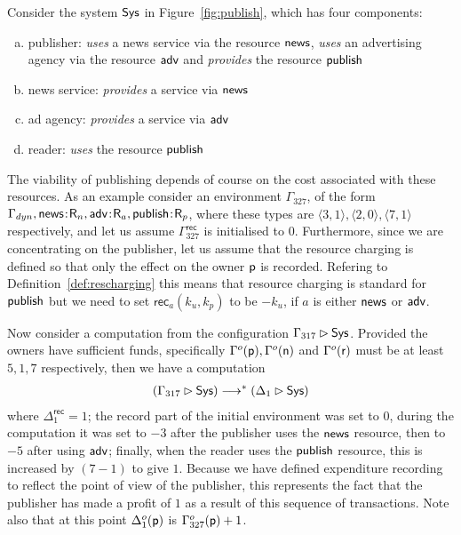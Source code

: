 \documentclass{LMCS}
\newcommand{\with}{\mathbin \rhd}
\newcommand{\record}{{\scriptstyle \mathsf{rec}}}
\newcommand{\Gammadyn}{\Gamma_{\scriptstyle dyn}}
\def\pair(#1,#2){\langle #1 , #2 \rangle}\newcommand{\parrow}{ \mathbin{\rightharpoonup}}
\newcommand{\typeletter}[1]{{\mathsf{#1}}}
\newcommand{\tR}{\typeletter{R}}
\newcommand{\Cassoc}[2]{ {{#1}\kern -0.2em : \kern -0.2em {#2}}}
\newcommand{\smalleval}{\longrightarrow}  \newcommand{\csmalleval}[1]{\longrightarrow^{#1}}
\begin{document}
\begin{exa}[Publishing]\label{ex:publishing}

  Consider the system $\mathsf{Sys}$ in Figure~\ref{fig:publish}, which has four components:
  \begin{enumerate}[(a)]
  \item publisher:  \emph{uses} a news service via the resource $\mathsf{news}$,
        \emph{uses} an advertising agency via the resource $\mathsf{adv}$ and \emph{provides} 
         the resource  $\mathsf{publish}$ 

 \item news service: \emph{provides} a service via $\mathsf{news}$

 \item ad agency: \emph{provides} a service via $\mathsf{adv}$

 \item reader: \emph{uses} the resource $\mathsf{publish}$
  \end{enumerate}
The viability of publishing depends of course on the cost associated with these resources.
As an example consider an environment $\Gamma_{327}$, of the form 
$\Gammadyn, 
\Cassoc{\news}{\tR_n},
\Cassoc{\adv}{\tR_a},
\Cassoc{\publish}{\tR_p}$, where these types are
$\pair(3,1),\pair(2,0),\pair(7,1)$ respectively, and let us assume 
$\Gamma_{327}^{\record}$ is initialised to $0$. 
Furthermore, since we are concentrating on the publisher, let us assume that the 
resource charging is defined so that only the effect on the owner ${\mathsf{p}}$ is 
recorded. Refering to Definition~\ref{def:rescharging} this means that resource charging
is standard for $\mathsf{publish}$ but 
we need to set $\record_{a}(k_u,k_p)$ to be $-k_u$, if
$a$ is either $\mathsf{news}$ or $\mathsf{adv}$. 

Now consider a computation from the configuration $\Gamma_{317} \with \Sys$. 
Provided the owners have sufficient funds, specifically $\Gamma^o({\mathsf{p}}), 
\Gamma^o({\mathsf{n}})$ and $\Gamma^o({\mathsf{r}})$ must be at least $5,1,7$ respectively,
then we have a computation
\begin{align*}
  (\Gamma_{317} \with \Sys)  \smalleval^* (\Delta_1 \with \Sys)
\end{align*}
where $\Delta_1^\record = 1$; the record part of the initial
environment was set to $0$, during the computation it was set to $-3$
after the publisher uses the $\mathsf{news}$ resource, then to $-5$ after
using $\mathsf{adv}$; finally, when the reader uses the $\mathsf{publish}$ resource,
this is increased by $(7-1)$ to give $1$.  Because we have defined
expenditure recording to reflect the point of view of the publisher, this
represents the fact that the publisher has made a profit of $1$ as a
result of this sequence of transactions.  Note also that at this point
$\Delta_1^o({{\mathsf{p}}})$ is $\Gamma_{327}^o({{\mathsf{p}}}) + 1$.



\end{exa}
\end{document}
